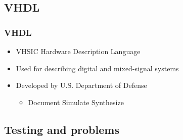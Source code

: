 \documentclass[british,10pt]{beamer}
\begin{document}
\subsection{VHDL}
\begin{frame}\frametitle{VHDL}
\begin{itemize}
\item VHSIC Hardware Description Language
\item Used for describing digital and mixed-signal systems 
\item Developed by U.S. Department of Defense
\begin{itemize}
\item Document  Simulate  Synthesize
\end{itemize}
\end{itemize}
\end{frame}

\subsection{Testing and problems}
\end{document}

